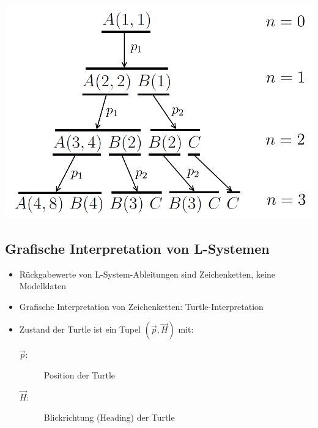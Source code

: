 \newpage
\begin{center}
	\includegraphics[height=1\textheight]{images/CH2_ParamLSystemBeispiel.png}
\end{center}




\newpage
\slidetitle{}
\subsection{Grafische Interpretation von L-Systemen\\}

\begin{itemize}
	\item Rückgabewerte von L-System-Ableitungen sind Zeichenketten, keine Modelldaten\\
	
	\item Grafische Interpretation von Zeichenketten: Turtle-Interpretation\\
	
	\item Zustand der Turtle ist ein Tupel $(\overrightarrow{p}, \overrightarrow{H})$ mit:
	\begin{description}
		\item[\boldmath$\overrightarrow{p}:$] Position der Turtle\\
		
		\item[\boldmath$\overrightarrow{H}:$] Blickrichtung (Heading) der Turtle
	\end{description}
\end{itemize}






